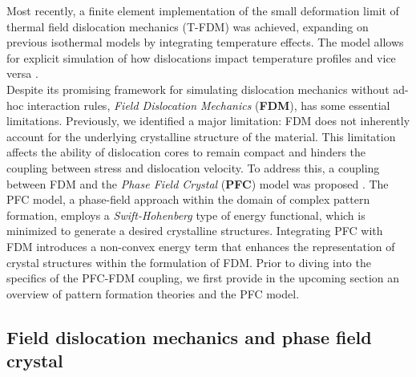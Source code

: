\documentclass{article}
\begin{document}
Most recently, a finite element implementation of the small deformation limit of thermal field dislocation mechanics (T-FDM) was achieved, expanding on previous isothermal models by integrating temperature effects. The model allows for explicit simulation of how dislocations impact temperature profiles and vice versa \parencite{lima-chavesFiniteelement2024}.\\

Despite its promising framework for simulating dislocation mechanics without ad-hoc interaction rules, \emph{Field Dislocation Mechanics} (\textbf{FDM}), has some essential limitations. Previously, we identified a major limitation: FDM does not inherently account for the underlying crystalline structure of the material. This limitation affects the ability of dislocation cores to remain compact and hinders the coupling between stress and dislocation velocity. To address this, a coupling between FDM and the \emph{Phase Field Crystal} (\textbf{PFC}) model was proposed \parencite{acharyaFielddislocation2020}. The PFC model, a phase-field approach within the domain of complex pattern formation, employs a \emph{Swift-Hohenberg} type of energy functional, which is minimized to generate a desired crystalline structures. Integrating PFC with FDM introduces a non-convex energy term that enhances the representation of crystal structures within the formulation of FDM. Prior to diving into the specifics of the PFC-FDM coupling, we first provide in the upcoming section an overview of pattern formation theories and the PFC model.
\subsection{Field dislocation mechanics and phase field crystal}
\end{document}
